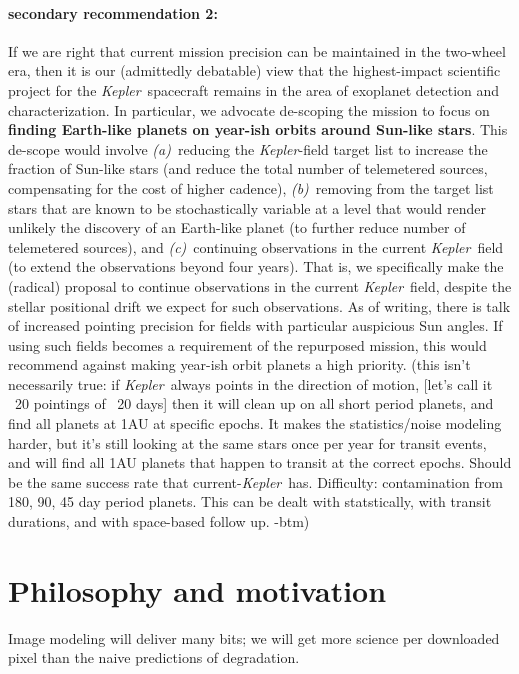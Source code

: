 \documentclass[12pt]{article}
\newcommand{\observatory}[1]{\textsl{#1}}
\newcommand{\kepler}{\observatory{Kepler}}
\newcommand{\Kepler}{\kepler}
\begin{document}
\paragraph{secondary recommendation 2:}
If we are right that current mission precision can be maintained in the two-wheel era,
  then it is our (admittedly debatable) view that the highest-impact scientific project for the \Kepler\ spacecraft
  remains in the area of exoplanet detection and characterization.
In particular, we advocate de-scoping the mission to focus on
  \textbf{finding Earth-like planets on year-ish orbits around Sun-like stars}.
This de-scope would involve
  \textsl{(a)}~reducing the \Kepler-field target list to increase the fraction of Sun-like stars
  (and reduce the total number of telemetered sources, compensating for the cost of higher cadence),
  \textsl{(b)}~removing from the target list stars that are known to be stochastically variable
  at a level that would render unlikely the discovery of an Earth-like planet
  (to further reduce number of telemetered sources),
  and \textsl{(c)}~continuing observations in the current \Kepler\ field
  (to extend the observations beyond four years).
That is, we specifically make the (radical) proposal to continue observations in the current \Kepler\ field,
  despite the stellar positional drift we expect for such observations.
As of writing, there is talk of increased pointing precision for fields with particular auspicious Sun angles.
If using such fields becomes a requirement of the repurposed mission,
  this would recommend against making year-ish orbit planets a high priority.
   (this isn't necessarily true: if \Kepler\ always points in the direction of motion,
   [let's call it ~20 pointings of ~20 days] then it will clean up on all short period planets,
   and find all planets at 1AU at specific epochs. It makes the statistics/noise modeling harder, but 
   it's still looking at the same stars once per year for transit events, and will find all 1AU planets 
   that happen to transit at the correct epochs. Should be the same success rate that current-\Kepler\ has.
   Difficulty: contamination from 180, 90, 45 day period planets. 
   This can be dealt with statstically, with transit durations, and with space-based follow up. -btm)

\section{Philosophy and motivation}

Image modeling will deliver many bits; we will get more science per
downloaded pixel than the naive predictions of degradation.
\end{document}
